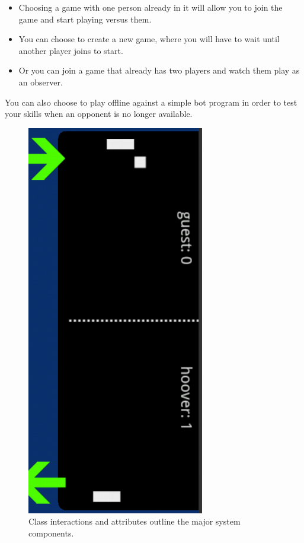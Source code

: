 \documentclass[12pt]{article}
\begin{document}
\begin{itemize}
\item Choosing a game with one person already in it will allow you to join the game and start playing versus them.
\item You can choose to create a new game, where you will have to wait until another player joins to start.
\item Or you can join a game that already has two players and watch them play as an observer.
\end{itemize}
You can also choose to play offline against a simple bot program in order to test your skills when an opponent is no longer available.
\begin{figure}
\begin{center}
\includegraphics[scale=.7]{ touchOnServer.png}
\caption{\label{domainModel}Class interactions and attributes outline the major system components.}
\end{center}
\end{figure}
\end{document}
